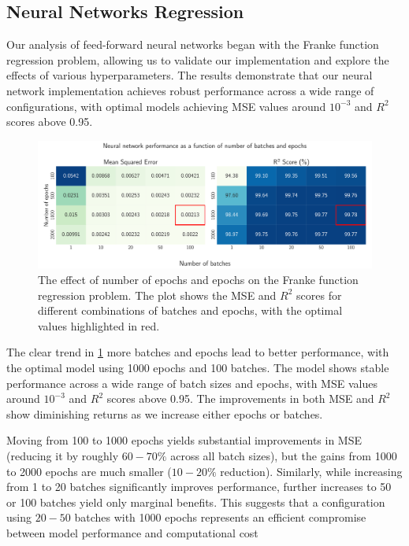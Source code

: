 \subsection{Neural Networks Regression}

Our analysis of feed-forward neural networks began with the Franke function regression problem, allowing us to validate our implementation and explore the effects of various hyperparameters. The results demonstrate that our neural network implementation achieves robust performance across a wide range of configurations, with optimal models achieving MSE values around \( 10^{-3} \) and \( R^2 \) scores above 0.95.

\onecolumngrid
\begin{figure}[h!]
    \begin{minipage}{\textwidth}
        \centering
        \includegraphics[width = .9\textwidth]{../figs/c_batch_epoch.pdf}
        \caption{The effect of number of epochs and epochs on the Franke function regression problem. The plot shows the MSE and \( R^2 \) scores for different combinations of batches and epochs, with the optimal values highlighted in red.}
        \label{fig:NN_Franke_batch_epoch}
    \end{minipage}
\end{figure}
\twocolumngrid

The clear trend in \cref{fig:NN_Franke_batch_epoch} more batches and epochs lead to better performance, with the optimal model using 1000 epochs and 100 batches. The model shows stable performance across a wide range of batch sizes and epochs, with MSE values around \( 10^{-3} \) and \( R^2 \) scores above 0.95. The improvements in both MSE and $R^2$ show diminishing returns as we increase either epochs or batches.

Moving from 100 to 1000 epochs yields substantial improvements in MSE (reducing it by roughly $60-70\%$ across all batch sizes), but the gains from 1000 to 2000 epochs are much smaller ($10-20\%$ reduction). Similarly, while increasing from 1 to 20 batches significantly improves performance, further increases to 50 or 100 batches yield only marginal benefits. This suggests that a configuration using $20-50$ batches with 1000 epochs represents an efficient compromise between model performance and computational cost

